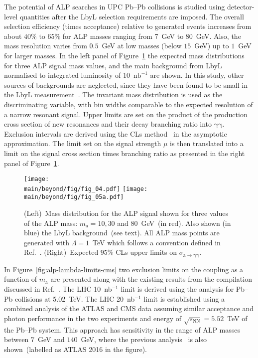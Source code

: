 The potential of ALP searches in UPC Pb--Pb collisions is studied using detector-level quantities after the LbyL selection requirements are imposed. The overall selection efficiency (times acceptance) relative to generated events increases from about $40$\% to $65$\% for ALP masses ranging from $7$~GeV to $80$~GeV. Also, the mass resolution varies from $0.5$~GeV at low masses (below $15$~GeV) up to $1$~GeV for larger masses. In the left panel of Figure~\ref{fig:alp} the expected mass distributions for three ALP signal mass values, and the main background from LbyL normalised to integrated luminosity of 10~$\mathrm{nb}^{-1}$ are shown. In this study, other sources of backgrounds are neglected, since they have been found to be small in the LbyL measurement~\cite{Aaboud:2017bwk}. The invariant mass distribution is used as the discriminating variable, with bin widths comparable to the expected resolution of a narrow resonant signal.
Upper limits are set on the product of the production cross section of
new resonances and their decay branching ratio into $\mathrm{\gamma\gamma}$. Exclusion intervals are derived using the CLs method~\cite{Read:2002hq} in the asymptotic approximation. The limit set on the signal strength $\mu$ is then translated into a limit on the signal cross section times branching ratio as presented in the right panel of Figure~\ref{fig:alp}.
\begin{figure}[!htbp]
\centering
  \texttt{[image: \\main/beyond/fig/fig\_04.pdf]}
  \texttt{[image: \\main/beyond/fig/fig\_05a.pdf]}
  \caption{(Left)~Mass distribution for the ALP signal
  shown for three values of the ALP mass: $m_\mathrm{a}=10, 30$ and
  $80$~GeV~(in red). Also shown (in blue) the LbyL background~(see
  text). All ALP mass points are generated with $\Lambda = 1$~TeV which follows a convention defined in Ref.~\cite{Knapen:2016moh}.
  (Right)~Expected $95$\% CLs upper limits on $\sigma_{\mathrm{a\rightarrow \gamma \gamma}}$.}
  \label{fig:alp}
\end{figure}

In Figure~\ref{fig:alp-lambda-limits-cms} two exclusion limits on the coupling as a function of $m_\mathrm{a}$ are presented along with the existing results from the compilation discussed in Ref.~\cite{Baldenegro:2018hng}. The LHC 10~nb$^{-1}$ limit is derived using the analysis for Pb--Pb collisions at 5.02~TeV. The LHC 20~nb$^{-1}$ limit is established using a combined analysis of the ATLAS and CMS data assuming similar acceptance and photon performance in the two experiments and energy of $\sqrt{s_{\mathrm{NN}}}=5.52$~TeV of the Pb--Pb system.
This approach has sensitivity in the range of ALP masses between $7$~GeV and $140$~GeV, where the previous analysis~\cite{Knapen:2016moh} is also shown~(labelled as ATLAS 2016 in the figure).

